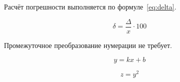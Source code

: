 Расчёт погрешности выполняется по формуле~\eqref{eq:delta}.

\begin{equation}
  \delta = \frac{\Delta}{x} \cdot 100
  \label{eq:delta}
\end{equation}

Промежуточное преобразование нумерации не требует.

\begin{equation*}
  y = kx + b
\end{equation*}

\begin{displaymath}
  z = y^2
\end{displaymath}
